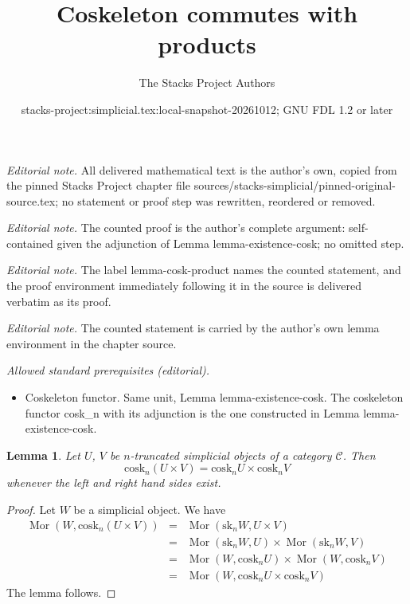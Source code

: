 \documentclass{stacks-project}
\title{Coskeleton commutes with products}
\author{The Stacks Project Authors}
\date{stacks-project:simplicial.tex:local-snapshot-20261012; GNU FDL 1.2 or later}
\theoremstyle{plain}
\newtheorem{lemma}[subsection]{Lemma}
\theoremstyle{definition}
\theoremstyle{remark}
\numberwithin{equation}{subsection}
\def\Mor{\mathop{\mathrm{Mor}}\nolimits}
\begin{document}
\maketitle
\noindent\textit{Editorial note.} All delivered mathematical text is the author's own, copied from the pinned Stacks Project chapter file sources/stacks-simplicial/pinned-original-source.tex; no statement or proof step was rewritten, reordered or removed.\par\medskip
\noindent\textit{Editorial note.} The counted proof is the author's complete argument: self-contained given the adjunction of Lemma lemma-existence-cosk; no omitted step.\par\medskip
\noindent\textit{Editorial note.} The label lemma-cosk-product names the counted statement, and the proof environment immediately following it in the source is delivered verbatim as its proof.\par\medskip
\noindent\textit{Editorial note.} The counted statement is carried by the author's own lemma environment in the chapter source.\par\medskip
\noindent\textit{Allowed standard prerequisites (editorial).}\begin{itemize}
\item Coskeleton functor. Same unit, Lemma lemma-existence-cosk. The coskeleton functor cosk\_n with its adjunction is the one constructed in Lemma lemma-existence-cosk.
\end{itemize}\medskip
\begin{lemma}
\label{lemma-cosk-product}
Let $U$, $V$ be $n$-truncated simplicial objects of a
category $\mathcal{C}$. Then
$$
\text{cosk}_n (U \times V) = \text{cosk}_nU \times \text{cosk}_nV
$$
whenever the left and right hand sides exist.
\end{lemma}

\begin{proof}
Let $W$ be a simplicial object. We have
\begin{eqnarray*}
\Mor(W, \text{cosk}_n (U \times V))
& = &
\Mor(\text{sk}_n W, U \times V) \\
& = &
\Mor(\text{sk}_n W, U)
\times
\Mor(\text{sk}_nW, V) \\
& = &
\Mor(W, \text{cosk}_n U)
\times
\Mor(W, \text{cosk}_n V) \\
& = &
\Mor(W, \text{cosk}_n U \times \text{cosk}_n V)
\end{eqnarray*}
The lemma follows.
\end{proof}
\end{document}

